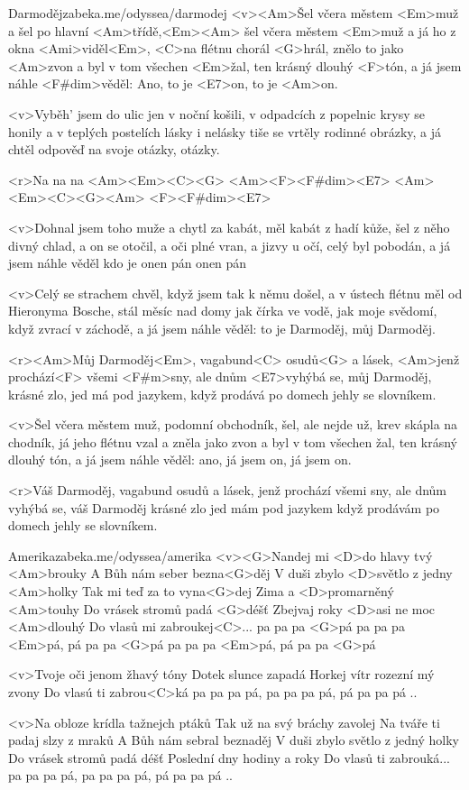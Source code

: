 \begin{song}{61}{Darmoděj}{zabeka.me/odyssea/darmodej}
<v><Am>Šel včera městem <Em>muž 
a šel po hlavní <Am>třídě,<Em><Am>
šel včera městem <Em>muž 
a já ho z okna <Ami>viděl<Em>,
<C>na flétnu chorál <G>hrál, 
znělo to jako <Am>zvon
a byl v tom všechen <Em>žal, 
ten krásný dlouhý <F>tón,
a já jsem náhle <F#dim>věděl: 
Ano, to je <E7>on, to je <Am>on.

<v>Vyběh' jsem do ulic jen v noční košili,
v odpadcích z popelnic krysy se honily
a v teplých postelích lásky i nelásky
tiše se vrtěly rodinné obrázky,
a já chtěl odpověď na svoje otázky, otázky.

<r>Na na na <Am><Em><C><G>
<Am><F><F#dim><E7>
<Am><Em><C><G><Am>
<F><F#dim><E7>

<v>Dohnal jsem toho muže a chytl za kabát,
měl kabát z hadí kůže, šel z něho divný chlad,
a on se otočil, a oči plné vran,
a jizvy u očí, celý byl pobodán,
a já jsem náhle věděl kdo je onen pán onen pán

<v>Celý se strachem chvěl, 
když jsem tak k němu došel,
a v ústech flétnu měl od Hieronyma Bosche,
stál měsíc nad domy jak čírka ve vodě,
jak moje svědomí, když zvrací v záchodě,
a já jsem náhle věděl: 
to je Darmoděj, můj Darmoděj.

<r><Am>Můj Darmoděj<Em>, 
vagabund<C> osudů<G> a lásek,
<Am>jenž prochází<F> všemi <F#m>sny, 
ale dnům <E7>vyhýbá se,
můj Darmoděj, krásné zlo, 
jed má pod jazykem,
když prodává po domech jehly se slovníkem.

<v>Šel včera městem muž, podomní obchodník,
šel, ale nejde už, krev skápla na chodník,
já jeho flétnu vzal a zněla jako zvon
a byl v tom všechen žal, ten krásný dlouhý tón,
a já jsem náhle věděl: 
ano, já jsem on, já jsem on.

<r>Váš Darmoděj, vagabund osudů a lásek,
jenž prochází všemi sny, ale dnům vyhýbá se,
váš Darmoděj krásné zlo jed mám pod jazykem
když prodávám po domech jehly se slovníkem.

\end{song}
\begin{song}[Lucie]{62}{Amerika}{zabeka.me/odyssea/amerika}
<v><G>Nandej mi <D>do hlavy tvý <Am>brouky
A Bůh nám seber bezna<G>děj
V duši zbylo <D>světlo z jedny <Am>holky
Tak mi teď za to vyna<G>dej
Zima a <D>promarněný <Am>touhy
Do vrásek stromů padá <G>déšť
Zbejvaj roky <D>asi ne moc <Am>dlouhý
Do vlasů mi zabroukej<C>... pa pa pa <G>pá
pa pa pa <Em>pá, pá pa pa <G>pá
pa pa pa <Em>pá, pá pa pa <G>pá

<v>Tvoje oči jenom žhavý tóny
Dotek slunce zapadá
Horkej vítr rozezní mý zvony
Do vlasú ti zabrou<C>ká
pa pa pa pá, pa pa pa pá, pá pa pa pá ..

<v>Na obloze krídla tažnejch ptáků
Tak už na svý bráchy zavolej
Na tváře ti padaj slzy z mraků
A Bůh nám sebral beznaděj
V duši zbylo světlo z jedný holky
Do vrásek stromů padá déšť
Poslední dny hodiny a roky
Do vlasů ti zabrouká...
pa pa pa pá, pa pa pa pá, pá pa pa pá .. 

\end{song}
